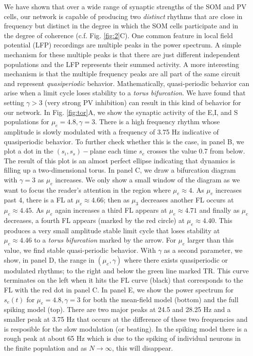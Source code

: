 \documentclass[10pt,letterpaper]{article}
\begin{document}
We have shown that over a wide range of synaptic strengths of the SOM and PV cells, our network is capable of producing two {\em distinct} rhythms that are close in frequency but distinct in the degree in which the SOM cells participate and in the degree of coherence (c.f. Fig. \ref{fig:2}C).  One common feature in local field potential (LFP) recordings are multiple peaks in the power spectrum. A simple mechanism for these multiple peaks is that there are just different independent populations and the LFP represents their summed activity.  A more interesting mechanism is that the multiple frequency peaks are all part of the same circuit and represent {\em quasiperiodic} behavior. Mathematically, quasi-periodic behavior can arise when a limit cycle loses stability to a {\em torus bifurcation}.  We have found that setting $\gamma>3$ (very strong PV inhibition) can result in this kind of behavior for our network.  In Fig. \ref{fig:tor}A, we show the synaptic activity of the E,I, and S populations for $\mu_e=4.8,\gamma=3$. There is a high frequency rhythm whose amplitude is slowly modulated with a frequency of 3.75 Hz indicative of quasiperiodic behavior.  To further check whether this is the case, in panel B, we plot a dot in the $(s_i,s_s)-$plane each time $s_e$ crosses the value 0.7 from below.  The result of this plot is an almost perfect ellipse indicating that dynamics is filling up a two-dimensional torus.  In  panel C, we draw a bifurcation diagram with $\gamma=3$ as $\mu_e$ increases. We only show a small window of the diagram as we want to focus the reader's attention in the region where $\mu_e\approx 4$. As $\mu_e$ increases past 4, there is a FL at $\mu_e\approx4.66$; then as $\mu_3$ decreases another FL occurs at $\mu_e\approx 4.45$. As $\mu_e$ again increases a third FL appears at $\mu_e\approx4.71$ and finally as $\mu_e$ decreases, a fourth FL appears (marked by the red circle) at $\mu_e\approx4.40$. This produces a very small amplitude stable limit cycle that loses stability at $\mu_e\approx4.46$ to a {\em torus bifurcation} marked by the arrow.  For $\mu_e$ larger than this value, we find stable quasi-periodic behavior. With $\gamma$  as a second parameter, we show, in panel D, the range in $(\mu_e,\gamma)$ where there exists quasiperiodic or modulated rhythms; to the right and below the green line marked TR. This curve terminates on the left when it hits the FL curve (black) that corresponds to the FL with the red dot in panel C.  In panel E, we show the power spectrum for $s_e(t)$ for $\mu_e=4.8,\gamma=3$ for both the mean-field model (bottom) and the full spiking model (top).  There are two major peaks at 24.5 and 28.25 Hz and a smaller peak at 3.75 Hz that occurs at the difference of these two frequencies and is resposible for the slow modulation (or beating).  In the spiking model there is a rough peak at about 65 Hz which is due to the spiking of individual neurons in the finite population and as $N\to\infty$, this will disappear.
\end{document}
